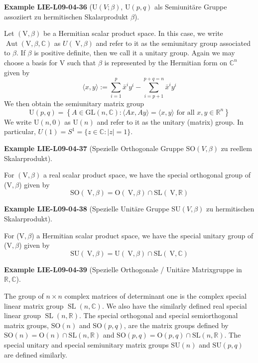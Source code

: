 \documentclass[10pt, letterpaper]{article}
\newcommand{\R}{\mathbb{R}}
\newcommand{\C}{\mathbb{C}}
\newcommand{\SO}{\mathrm{SO}}
\newcommand{\SU}{\mathrm{SU}}
\newcommand{\U}{\mathrm{U}}
\newcommand{\CustomHeading}[3]{%
  \par\medskip\noindent%
  \textbf{#1 #2} \textnormal{(#3)}.\enskip%
}
\newenvironment{EXA}[2]{\CustomHeading{Example}{#1}{#2}}{}
\begin{document}
\begin{EXA}{LIE-L09-04-36}{$\U(V;\beta)$, $\U(p,q)$ als Semiunitäre Gruppe assoziiert zu hermitischen Skalarprodukt $\beta$}
Let $(\mathrm{V}, \beta)$ be a Hermitian scalar product space. In this case, we write $\operatorname{Aut}(\mathrm{V},\beta,\mathbb{C})$ as $U(\mathrm{~V},\beta)$ and refer to it as the semiunitary group associated to $\beta$. If $\beta$ is positive definite, then we call it a unitary group. Again we may choose a basis for V such that $\beta$ is represented by the Hermitian form on $\mathbb{C}^{n}$ given by
$$
\langle x, y\rangle:=\sum_{i=1}^{p} \bar{x}^{i} y^{i}-\sum_{i=p+1}^{p+q=n} \bar{x}^{i} y^{i}
$$
We then obtain the semiunitary matrix group
$$
\mathrm{U}(p, q)=\left\{A \in \mathrm{GL}(n, \mathbb{C}):\langle A x, A y\rangle=\langle x, y\rangle \text { for all } x, y \in \mathbb{R}^{n}\right\}
$$
We write $\mathrm{U}(n, 0)$ as $\mathrm{U}(n)$ and refer to it as the unitary (matrix) group. In particular, $U(1)=S^{1}=\{z \in \mathbb{C}:|z|=1\}$.
\end{EXA}

\begin{EXA}{LIE-L09-04-37}{Spezielle Orthogonale Gruppe $\SO(V,\beta)$ zu reellem Skalarprodukt}
For $(\mathrm{V},\beta)$ a real scalar product space, we have the special orthogonal group of ($\mathrm{V},\beta$) given by
$$
\mathrm{SO}(\mathrm{~V}, \beta)=\mathrm{O}(\mathrm{~V}, \beta) \cap \mathrm{SL}(\mathrm{~V}, \mathbb{R})
$$
\end{EXA}

\begin{EXA}{LIE-L09-04-38}{Spezielle Unitäre Gruppe $\SU(V,\beta)$ zu hermitischen Skalarprodukt}
For ($\mathrm{V},\beta$) a Hermitian scalar product space, we have the special unitary group of ($\mathrm{V},\beta$) given by
$$
\mathrm{SU}(\mathrm{~V}, \beta)=\mathrm{U}(\mathrm{~V}, \beta) \cap \mathrm{SL}(\mathrm{~V}, \mathbb{C})
$$
\end{EXA}

\begin{EXA}{LIE-L09-04-39}{Spezielle Orthogonale / Unitäre Matrixgruppe in $\R,\C$}
The group of $n \times n$ complex matrices of determinant one is the complex special linear matrix group $\operatorname{SL}(n, \mathbb{C})$. We also have the similarly defined real special linear group $\operatorname{SL}(n, \mathbb{R})$. The special orthogonal and special semiorthogonal matrix groups, $\mathrm{SO}(n)$ and $\mathrm{SO}(p, q)$, are the matrix groups defined by $\mathrm{SO}(n)=\mathrm{O}(n) \cap \mathrm{SL}(n, \mathbb{R})$ and $\mathrm{SO}(p, q)=\mathrm{O}(p, q) \cap \mathrm{SL}(n, \mathbb{R})$. The special unitary and special semiunitary matrix groups $\mathrm{SU}(n)$ and $\mathrm{SU}(p, q)$ are defined similarly.
\end{EXA}
\end{document}
